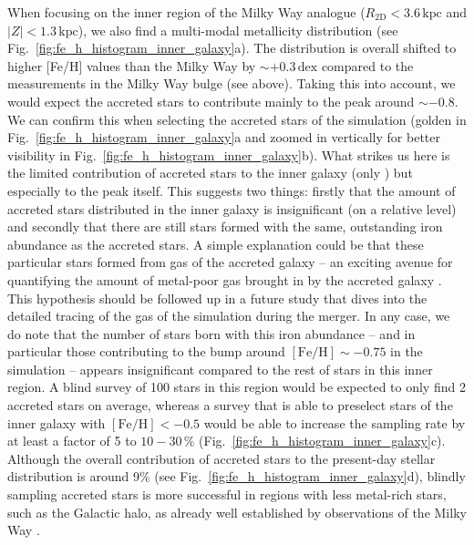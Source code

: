 \documentclass[fleqn,usenatbib]{mnras}
\begin{document}
When focusing on the inner region of the Milky Way analogue ($R_\mathrm{2D} < 3.6\,\mathrm{kpc}$ and $\vert Z\vert < 1.3\,\mathrm{kpc}$), we also find a multi-modal metallicity distribution (see Fig.~\ref{fig:fe_h_histogram_inner_galaxy}a). The distribution is overall shifted to higher [Fe/H] values than the Milky Way by $\sim+0.3\,\mathrm{dex}$ compared to the measurements in the Milky Way bulge (see above). Taking this into account, we would expect the accreted stars to contribute mainly to the peak around $\sim-0.8$. We can confirm this when selecting the accreted stars of the simulation (golden in Fig.~\ref{fig:fe_h_histogram_inner_galaxy}a and zoomed in vertically for better visibility in Fig.~\ref{fig:fe_h_histogram_inner_galaxy}b). What strikes us here is the limited contribution of accreted stars to the inner galaxy (only ) but especially to the peak itself. This suggests two things: firstly that the amount of accreted stars distributed in the inner galaxy is insignificant (on a relative level) and secondly that there are still stars formed with the same, outstanding iron abundance as the accreted stars. A simple explanation could be that these particular stars formed from gas of the accreted galaxy -- an exciting avenue for quantifying the amount of metal-poor gas brought in by the accreted galaxy \citep{Buck2023}. This hypothesis should be followed up in a future study that dives into the detailed tracing of the gas of the simulation during the merger. In any case, we do note that the number of stars born with this iron abundance -- and in particular those contributing to the bump around $\mathrm{[Fe/H] \sim -0.75}$ in the simulation -- appears insignificant compared to the rest of stars in this inner region. A blind survey of 100 stars in this region would be expected to only find 2 accreted stars on average, whereas a survey that is able to preselect stars of the inner galaxy with $\mathrm{[Fe/H]} < -0.5$ would be able to increase the sampling rate by at least a factor of 5 to $10-30\,\%$ (Fig.~\ref{fig:fe_h_histogram_inner_galaxy}c). Although the overall contribution of accreted stars to the present-day stellar distribution is around 9\% (see Fig.~\ref{fig:fe_h_histogram_inner_galaxy}d), blindly sampling accreted stars is more successful in regions with less metal-rich stars, such as the Galactic halo, as already well established by observations of the Milky Way \citep[e.g.][]{Conroy2019}.
\end{document}
